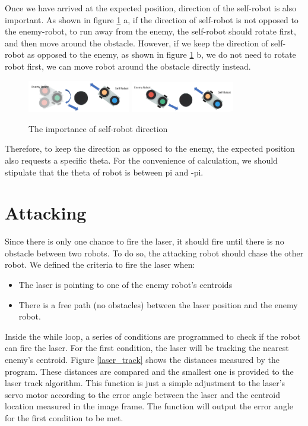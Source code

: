 Once we have arrived at the expected position, direction of the self-robot is also important. As shown in figure \ref{hiding_implement3} a, if the direction of self-robot is not opposed to the enemy-robot, to run away from the enemy, the self-robot should rotate first, and then move around the obstacle. However, if we keep the direction of self-robot as opposed to the enemy, as shown in figure \ref{hiding_implement3} b, we do not need to rotate robot first, we can move robot around the obstacle directly instead.
\begin{figure}[htbp]
\centering
\includegraphics[width =0.4\textwidth]{images/implementofhiding3-1.png}
\includegraphics[width =0.4\textwidth]{images/implementofhiding3-2.png}
\caption{The importance of self-robot direction}\label{hiding_implement3}
\end{figure}

Therefore, to keep the direction as opposed to the enemy, the expected position also requests a specific theta.  For the convenience of calculation, we should stipulate that the theta of robot is between pi and -pi.





\section{Attacking}
Since there is only one chance to fire the laser, it should fire until there is no obstacle between two robots. To do so, the attacking robot should chase the other robot. We defined the criteria to fire the laser when:
\begin{itemize}

  \item The laser is pointing to one of the enemy robot’s centroids
  \item There is a free path (no obstacles) between the laser position and the enemy robot.
\end{itemize}
Inside the while loop, a series of conditions are programmed to check if the robot can fire the laser. For the first condition, the laser will be tracking the nearest enemy’s centroid. Figure \ref{laser_track} shows the distances measured by the program. These distances are compared and the smallest one is provided to the laser track algorithm. This function is just a simple adjustment to the laser's servo motor according to the error angle between the laser and the centroid location measured in the image frame. The function will output the error angle for the first condition to be met.

